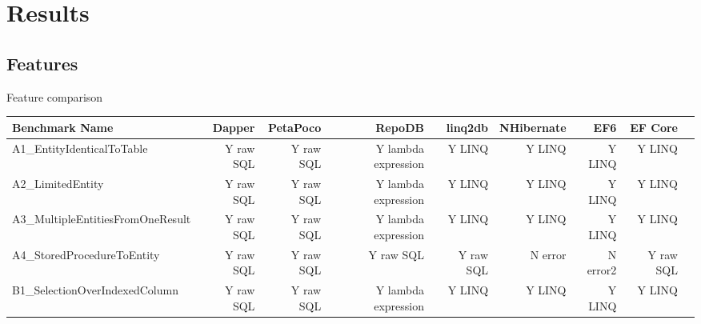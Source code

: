 \section{Results}

\subsection{Features}


\clearpage
\begin{landscape}
\begin{adjustwidth}{-2.5 cm}{-2.5 cm}\centering\begin{threeparttable}[!htb]
\caption{Feature comparison}\label{tab:feature_comp }
\scriptsize
\begin{tabular}{lrrrrrrrr}\toprule
Benchmark Name &Dapper &PetaPoco &RepoDB &linq2db &NHibernate &EF6 &EF Core \\\midrule
A1\_EntityIdenticalToTable &Y raw SQL &Y raw SQL &\cellcolor[HTML]{d9ead3}Y lambda expression &\cellcolor[HTML]{b7e1cd}Y LINQ &\cellcolor[HTML]{b7e1cd}Y LINQ &\cellcolor[HTML]{b7e1cd}Y LINQ &\cellcolor[HTML]{b7e1cd}Y LINQ \\
A2\_LimitedEntity &Y raw SQL &Y raw SQL &\cellcolor[HTML]{d9ead3}Y lambda expression &\cellcolor[HTML]{b7e1cd}Y LINQ &\cellcolor[HTML]{b7e1cd}Y LINQ &\cellcolor[HTML]{b7e1cd}Y LINQ &\cellcolor[HTML]{b7e1cd}Y LINQ \\
A3\_MultipleEntitiesFromOneResult &Y raw SQL &Y raw SQL &\cellcolor[HTML]{d9ead3}Y lambda expression &\cellcolor[HTML]{b7e1cd}Y LINQ &\cellcolor[HTML]{b7e1cd}Y LINQ &\cellcolor[HTML]{b7e1cd}Y LINQ &\cellcolor[HTML]{b7e1cd}Y LINQ \\
A4\_StoredProcedureToEntity &Y raw SQL &Y raw SQL &Y raw SQL &Y raw SQL &\cellcolor[HTML]{ea9999}N error &\cellcolor[HTML]{ea9999}N error2 &Y raw SQL \\
B1\_SelectionOverIndexedColumn &Y raw SQL &Y raw SQL &\cellcolor[HTML]{d9ead3}Y lambda expression &\cellcolor[HTML]{b7e1cd}Y LINQ &\cellcolor[HTML]{b7e1cd}Y LINQ &\cellcolor[HTML]{b7e1cd}Y LINQ &\cellcolor[HTML]{b7e1cd}Y LINQ \\

\end{tabular}
\end{threeparttable}
\end{adjustwidth}
\end{landscape}
